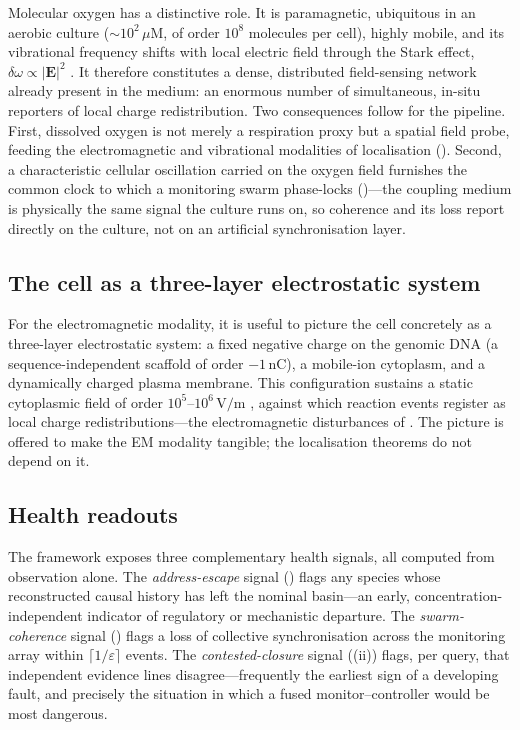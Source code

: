 \documentclass[11pt,twocolumn,a4paper]{article}
\theoremstyle{thmstyle}
\theoremstyle{definition}
\theoremstyle{remark}
\newcommand{\eps}{\varepsilon}
\begin{document}
Molecular oxygen has a distinctive role. It is paramagnetic, ubiquitous in
an aerobic culture ($\sim10^2\,\mu\mathrm{M}$, of order $10^8$ molecules per
cell), highly mobile, and its vibrational frequency shifts with local
electric field through the Stark effect, $\delta\omega\propto|\mathbf E|^2$
\citep{herzberg1950spectra,boxer2009stark}. It therefore constitutes a
dense, distributed field-sensing network already present in the medium: an
enormous number of simultaneous, in-situ reporters of local charge
redistribution. Two consequences follow for the pipeline. First, dissolved
oxygen is not merely a respiration proxy but a spatial field probe, feeding
the electromagnetic and vibrational modalities of localisation
(). Second, a characteristic cellular oscillation
carried on the oxygen field furnishes the common clock to which a
monitoring swarm phase-locks ()---the coupling medium is
physically the same signal the culture runs on, so coherence and its loss
report directly on the culture, not on an artificial synchronisation layer.

\subsection{The cell as a three-layer electrostatic system}

For the electromagnetic modality, it is useful to picture the cell
concretely as a three-layer electrostatic system: a fixed negative charge
on the genomic DNA (a sequence-independent scaffold of order $-1\,$nC), a
mobile-ion cytoplasm, and a dynamically charged plasma membrane. This
configuration sustains a static cytoplasmic field of order
$10^5$--$10^6\,\mathrm{V/m}$
\citep{israelachvili2011intermolecular,hille2001ion}, against which reaction
events register as local charge redistributions---the electromagnetic
disturbances of . The picture is offered to make the EM
modality tangible; the localisation theorems do not depend on it.

\subsection{Health readouts}

The framework exposes three complementary health signals, all computed from
observation alone. The \emph{address-escape} signal ()
flags any species whose reconstructed causal history has left the nominal
basin---an early, concentration-independent indicator of regulatory or
mechanistic departure. The \emph{swarm-coherence} signal
() flags a loss of collective synchronisation
across the monitoring array within $\lceil1/\eps\rceil$ events. The
\emph{contested-closure} signal ((ii)) flags, per query,
that independent evidence lines disagree---frequently the earliest sign of
a developing fault, and precisely the situation in which a fused
monitor--controller would be most dangerous.
\end{document}

